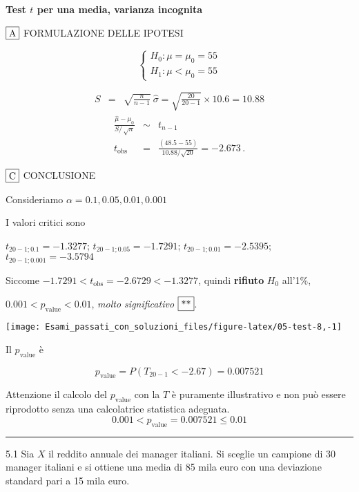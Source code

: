 \documentclass[
  11pt,
]{book}
\theoremstyle{mytheoremstyle}
\theoremstyle{mydefstyle}
\newenvironment{sol}
  {
  \begin{tcolorbox}[enhanced,breakable,arc=0.1mm,boxrule=1pt,colback=white,colframe=iblue,
  title=\bf \fontfamily{lmss}\selectfont \hspace{.5 cm} Soluzione,drop fuzzy shadow]

}{
\end{tcolorbox}
  }
\begin{document}
\begin{sol}
\textbf{Test \(t\) per una media, varianza incognita}

\(\fbox{A}\) FORMULAZIONE DELLE IPOTESI

\[\begin{cases}
   H_0: \mu = \mu_0=55 \\
   H_1: \mu < \mu_0=55 
   \end{cases}\]

\begin{eqnarray*}
   S    &=& \sqrt{\frac{n} {n-1}}\ \widehat{\sigma} 
   =  \sqrt{\frac{ 20 } { 20 -1}} \times  10.6  =  10.88 
   \end{eqnarray*}
\begin{eqnarray*}
   \frac{\hat\mu - \mu_{0}} {S/\,\sqrt{n}}&\sim&t_{n-1}\\
   t_{\text{obs}}
   &=& \frac{ ( 48.5 -  55 )} { 10.88 /\sqrt{ 20 }}
   =   -2.673 \, .
   \end{eqnarray*}

\(\fbox{C}\) CONCLUSIONE

Consideriamo \(\alpha=0.1, 0.05, 0.01, 0.001\)

I valori critici sono

\(t_{20-1;0.1}=-1.3277\); \(t_{20-1;0.05}=-1.7291\); \(t_{20-1;0.01}=-2.5395\); \(t_{20-1;0.001}=-3.5794\)

Siccome \(-1.7291<t_\text{obs}=-2.6729<-1.3277\), quindi \textbf{rifiuto} \(H_0\) all'1\%,

\(0.001<p_\text{value}<0.01\), \emph{molto significativo} \(\fbox{**}\).

\begin{center}\texttt{[image: Esami\_passati\_con\_soluzioni\_files/figure-latex/05-test-8,-1]} \end{center}

Il \(p_{\text{value}}\) è

\[ p_{\text{value}} = P(T_{20-1}<-2.67)=0.007521 \]

Attenzione il calcolo del \(p_\text{value}\) con la \(T\) è puramente illustrativo e non può essere riprodotto senza una calcolatrice statistica adeguata.\[
 0.001 < p_\text{value}= 0.007521 \leq 0.01 
\]

\end{sol}

\begin{center}\rule{0.5\linewidth}{0.5pt}\end{center}

5.1 Sia \(X\) il reddito annuale dei manager italiani.
Si sceglie un campione di 30 manager italiani e si ottiene una
media di 85 mila euro con una deviazione standard pari a 15 mila euro.
\end{document}
